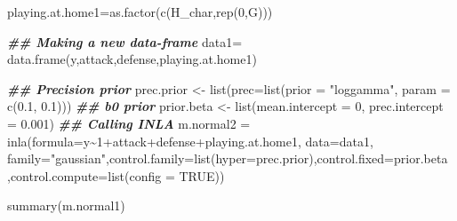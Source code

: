 \documentclass[
]{article}
\newenvironment{Shaded}{\begin{snugshade}}{\end{snugshade}}
\newcommand{\AttributeTok}[1]{\textcolor[rgb]{0.77,0.63,0.00}{#1}}
\newcommand{\ConstantTok}[1]{\textcolor[rgb]{0.00,0.00,0.00}{#1}}
\newcommand{\DecValTok}[1]{\textcolor[rgb]{0.00,0.00,0.81}{#1}}
\newcommand{\DocumentationTok}[1]{\textcolor[rgb]{0.56,0.35,0.01}{\textbf{\textit{#1}}}}
\newcommand{\FloatTok}[1]{\textcolor[rgb]{0.00,0.00,0.81}{#1}}
\newcommand{\FunctionTok}[1]{\textcolor[rgb]{0.00,0.00,0.00}{#1}}
\newcommand{\NormalTok}[1]{#1}
\newcommand{\OtherTok}[1]{\textcolor[rgb]{0.56,0.35,0.01}{#1}}
\newcommand{\SpecialCharTok}[1]{\textcolor[rgb]{0.00,0.00,0.00}{#1}}
\newcommand{\StringTok}[1]{\textcolor[rgb]{0.31,0.60,0.02}{#1}}
\begin{document}
\begin{Shaded}
\begin{Highlighting}[]
\NormalTok{playing.at.home1}\OtherTok{=}\FunctionTok{as.factor}\NormalTok{(}\FunctionTok{c}\NormalTok{(H\_char,}\FunctionTok{rep}\NormalTok{(}\DecValTok{0}\NormalTok{,G)))}

\DocumentationTok{\#\# Making a new data{-}frame  }
\NormalTok{data1}\OtherTok{=} \FunctionTok{data.frame}\NormalTok{(y,attack,defense,playing.at.home1)}

\DocumentationTok{\#\# Precision prior}
\NormalTok{prec.prior }\OtherTok{\textless{}{-}} \FunctionTok{list}\NormalTok{(}\AttributeTok{prec=}\FunctionTok{list}\NormalTok{(}\AttributeTok{prior =} \StringTok{"loggamma"}\NormalTok{, }\AttributeTok{param =} \FunctionTok{c}\NormalTok{(}\FloatTok{0.1}\NormalTok{, }\FloatTok{0.1}\NormalTok{)))}
\DocumentationTok{\#\# b0 prior}
\NormalTok{prior.beta }\OtherTok{\textless{}{-}} \FunctionTok{list}\NormalTok{(}\AttributeTok{mean.intercept =} \DecValTok{0}\NormalTok{, }\AttributeTok{prec.intercept =} \FloatTok{0.001}\NormalTok{)}
\DocumentationTok{\#\# Calling INLA}
\NormalTok{m.normal2 }\OtherTok{=} \FunctionTok{inla}\NormalTok{(}\AttributeTok{formula=}\NormalTok{y}\SpecialCharTok{\textasciitilde{}}\DecValTok{1}\SpecialCharTok{+}\NormalTok{attack}\SpecialCharTok{+}\NormalTok{defense}\SpecialCharTok{+}\NormalTok{playing.at.home1, }\AttributeTok{data=}\NormalTok{data1, }\AttributeTok{family=}\StringTok{"gaussian"}\NormalTok{,}\AttributeTok{control.family=}\FunctionTok{list}\NormalTok{(}\AttributeTok{hyper=}\NormalTok{prec.prior),}\AttributeTok{control.fixed=}\NormalTok{prior.beta}
\NormalTok{                 ,}\AttributeTok{control.compute=}\FunctionTok{list}\NormalTok{(}\AttributeTok{config =} \ConstantTok{TRUE}\NormalTok{))}

\FunctionTok{summary}\NormalTok{(m.normal1)}
\end{Highlighting}
\end{Shaded}
\end{document}
